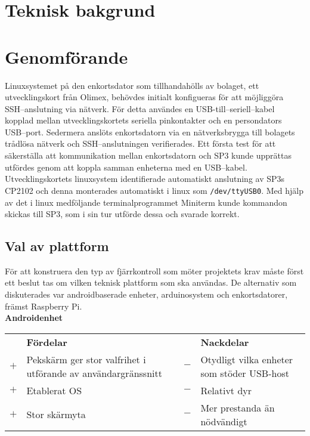 \documentclass{article}
\begin{document}
    \section{Teknisk bakgrund} %
    \label{sec:teknisk_bakgrund}
    


    \section{Genomförande} %
    \label{sec:genomforande}
        Linuxsystemet på den enkortsdator som tillhandahölls av bolaget, ett utvecklingskort från Olimex, behövdes initialt konfigueras för att möjliggöra SSH--\-anslutning via nätverk. För detta användes en USB-till--seriell--kabel kopplad mellan utvecklingskortets seriella pinkontakter och en persondators USB--port. Sedermera anslöts enkortsdatorn via en nätverksbrygga till bolagets trådlösa nätverk och SSH--anslutningen verifierades. Ett första test för att säkerställa att kommunikation mellan enkortsdatorn och SP3 kunde upprättas utfördes genom att koppla samman enheterna med en USB--kabel. Utvecklingskortets linuxsystem identifierade automatiskt anslutning av SP3s CP2102 och denna monterades automatiskt i linux som \texttt{/dev/ttyUSB0}. Med hjälp av det i linux medföljande terminalprogrammet Miniterm kunde kommandon skickas till SP3, som i sin tur utförde dessa och svarade korrekt.

        \subsection{Val av plattform} %
        \label{sub:val_av_plattform}
        För att konstruera den typ av fjärrkontroll som möter projektets krav måste först ett beslut tas om vilken teknisk plattform som ska användas. De alternativ som diskuterades var androidbaserade enheter, arduinosystem och enkortsdatorer, främst Raspberry Pi.\\

        \noindent\textsf{\textbf{Androidenhet}}\\
        \begin{tabularx}{\textwidth}{@{}cXcX}
            & \textbf{Fördelar}     & & \textbf{Nackdelar} \\
            $+$ & Pekskärm ger stor valfrihet i utförande av användargränssnitt     &                            $-$ & Otydligt vilka enheter som
                                              stöder USB-host \\
            $+$ &  Etablerat OS     &   $-$ & Relativt dyr \\
            $+$ &  Stor skärmyta    &   $-$ & Mer prestanda än nödvändigt
        \end{tabularx}\\
\end{document}
